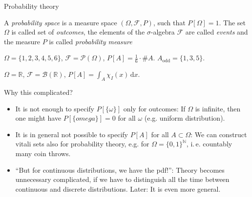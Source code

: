 \documentclass[compress]{beamer}
\newcommand{\RR}{\mathbb{R}}
\newcommand{\NN}{\mathbb{N}}
\newcommand{\td}{\,\mathrm{d}}  %
\begin{document}
\begin{frame}{Probability theory}
  \begin{definition}
    A \textit{probability space} is a measure space $(\Omega, \mathcal{F}, P)$,
    such that $P[\Omega]=1$.  The set $\Omega$ is called set of
    \textit{outcomes}, the elements of the $\sigma$-algebra $\mathcal{F}$ are
    called \textit{events} and the measure $P$ is called \textit{probability
      measure}
  \end{definition}
  \pause
  \begin{example}
    $\Omega=\{1,2,3,4,5,6\}$, $\mathcal{F} = \mathcal{P}(\Omega)$, $P[A] =
    \frac16\cdot \#A$. $A_{\text{odd}}=\{1,3,5\}$.
  \end{example}

  \begin{example}[Uniform on $I$]
    $\Omega=\RR$, $\mathcal{F} = \mathcal{B}(\RR)$, $P[A] = \int_A \chi_I(x)\td
    x$.
  \end{example}
\end{frame}

\begin{frame}
  Why this complicated?
  \begin{itemize}
  \item It is not enough to specify $P[\{\omega\}]$ only for outcomes: If
    $\Omega$ is infinite, then one might have $P[\{omega\}]=0$ for all $\omega$
    (e.g. uniform distribution).
  \item It is in general not possible to specify $P[A]$ for all $A \subset
    \Omega$: We can construct vitali sets also for probability theory, e.g. for
    $\Omega = \{0,1\}^\NN$, i.\,e. countably many coin throws.
  \item ``But for continuous distributions, we have the pdf!'': Theory becomes
    unnecessary complicated, if we have to distinguish all the time between
    continuous and discrete distributions. Later: It is even more general.
  \end{itemize}
\end{frame}
\end{document}
